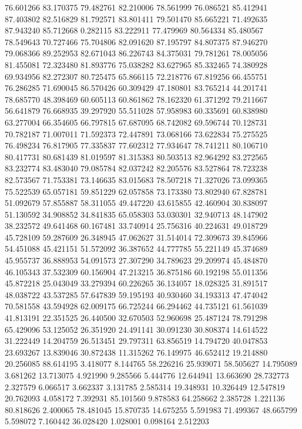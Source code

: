 76.601266
83.170375
79.482761
82.210006
78.561999
76.086521
85.412941
87.403802
82.516829
81.792571
83.801411
79.501470
85.665221
71.492635
87.943240
85.712668
0.282115
83.222911
77.479969
80.564334
85.480567
78.549643
70.727466
75.704806
82.091620
87.195797
84.807375
87.946270
79.068366
89.252953
82.671043
86.226743
84.375031
79.781261
78.005056
81.455081
72.323480
81.893776
75.038282
83.627965
85.332465
74.380928
69.934956
82.272307
80.725475
65.866115
72.218776
67.819256
66.455751
76.286285
71.690045
86.570426
60.309429
47.180801
83.765214
44.201741
78.685770
48.398469
60.605113
60.861862
78.162320
61.371292
79.211667
56.641879
76.668935
39.297920
55.511028
57.958983
60.335691
60.838980
63.277004
66.354605
66.797815
67.687095
68.742082
69.596744
70.128731
70.782187
71.007011
71.592373
72.447891
73.068166
73.622834
75.275525
76.498234
76.817905
77.335837
77.602312
77.934647
78.741211
80.106710
80.417731
80.681439
81.019597
81.315383
80.503513
82.964292
83.272565
83.232774
83.483040
79.085784
82.037242
82.205576
83.527864
78.723238
82.573567
71.753381
73.146635
83.015683
78.507218
71.327026
73.099365
75.522539
65.057181
59.851229
62.057858
73.173380
73.802940
67.828781
51.092679
57.855887
58.311055
49.447220
43.615855
42.460904
30.838097
51.130592
34.908852
34.841835
65.058303
53.030301
32.940713
48.147902
38.232572
49.641468
60.167481
33.740914
25.756316
40.224631
49.018729
45.728109
59.287609
26.348945
47.062627
31.514014
72.309673
39.845966
54.451088
45.421151
51.572092
36.387652
44.777785
55.221149
45.374689
45.955737
36.888953
54.091573
27.307290
34.789623
29.209974
45.484870
46.105343
37.532309
60.156904
47.213215
36.875186
60.192198
55.011356
45.872218
25.043049
33.279394
60.226265
36.134057
18.028325
31.891517
48.038722
43.537285
57.647839
59.195193
40.930460
34.193313
47.474042
70.581558
43.594928
62.009175
66.725244
66.294462
44.735121
61.561039
41.813191
22.351525
26.440500
32.670503
52.960698
25.487124
78.791298
65.429096
53.125052
26.351920
24.491141
30.091230
30.808374
14.614522
31.222449
14.204759
26.513451
29.797311
63.856519
14.794720
40.047853
23.693267
13.839046
30.872438
11.315262
76.149975
46.652412
19.214880
20.256085
88.614195
3.418077
8.144765
58.226216
25.939071
58.505627
14.795089
3.681262
13.713075
4.921990
9.285566
5.444776
12.644941
13.663690
28.732773
2.327579
6.066517
3.662337
3.131785
2.585314
19.348931
10.326449
12.547819
20.762093
4.058172
7.392931
85.101560
9.878583
64.258662
2.385728
1.221136
80.818626
2.400065
78.481045
15.870735
14.675255
5.591983
71.499367
48.665799
5.598072
7.160442
36.028420
1.028001
0.098164
2.512203
